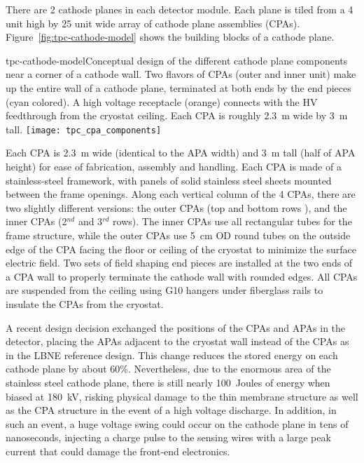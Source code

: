 There are 2 cathode planes in each detector module.  Each plane is
tiled from a 4 unit high by 25 unit wide array of cathode plane
assemblies (CPAs). Figure~\ref{fig:tpc-cathode-model} shows the
building blocks of a cathode plane.  
\begin{cdrfigure}
{tpc-cathode-model}{Conceptual design of the different cathode plane 
components near a corner of a cathode wall.  Two flavors of CPAs (outer 
and inner unit) make up the entire wall of a cathode plane, terminated 
at both ends by the end pieces (cyan colored).  A high voltage receptacle 
(orange) connects with the HV feedthrough from the cryostat ceiling. Each 
CPA is roughly 2.3~m wide by 3~m tall.}
\texttt{[image: tpc\_cpa\_components]}
\end{cdrfigure}
Each CPA is 2.3~m wide (identical to the APA width) and 3~m tall (half
of APA height) for ease of fabrication, assembly and handling.  Each
CPA is made of a stainless-steel framework, with panels of solid
stainless steel sheets mounted between the frame openings.  Along each
vertical column of the 4 CPAs, there are two slightly different
versions: the outer CPAs (top and bottom rows ), and the inner CPAs
(2$^{nd}$ and 3$^{rd}$ rows).  The inner CPAs use all rectangular tubes for the
frame structure, while the outer CPAs use 5~cm OD round tubes on the
outside edge of the CPA facing the floor or ceiling of the cryostat to
minimize the surface electric field.  Two sets of field shaping end
pieces are installed at the two ends of a CPA wall to properly
terminate the cathode wall with rounded edges.  All CPAs are suspended
from the ceiling using G10 hangers under fiberglass rails to insulate
the CPAs from the cryostat.

A recent design decision exchanged the positions of the CPAs and APAs
in the detector, placing the APAs adjacent to the cryostat wall
instead of the CPAs as in the LBNE reference design.  This change
reduces the stored energy on each cathode plane by about 60\%.
Nevertheless, due to the enormous area of the stainless steel cathode
plane, there is still nearly 100~Joules of energy when biased at
180~kV, risking physical damage to the thin membrane structure as well
as the CPA structure in the event of a high voltage discharge.  In
addition, in such an event, a huge voltage swing could occur on the
cathode plane in tens of nanoseconds, injecting a charge pulse to the
sensing wires with a large peak current that could damage the
front-end electronics.

